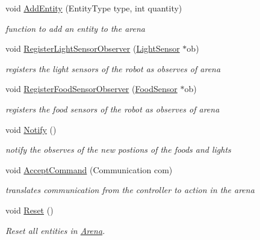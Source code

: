 \begin{DoxyCompactItemize}
void \mbox{\hyperlink{class_arena_a9e00ef1a079d49d648359952fcfaa9f3}{Add\+Entity}} (Entity\+Type type, int quantity)
\begin{DoxyCompactList}\small\item\em function to add an entity to the arena \end{DoxyCompactList}\item 
void \mbox{\hyperlink{class_arena_a3166b6d49cc1fa5a526317ee55eefa16}{Register\+Light\+Sensor\+Observer}} (\mbox{\hyperlink{class_light_sensor}{Light\+Sensor}} $\ast$ob)
\begin{DoxyCompactList}\small\item\em registers the light sensors of the robot as observes of arena \end{DoxyCompactList}\item 
void \mbox{\hyperlink{class_arena_acb467d8cd9635b2dd0a3a22f08f543c7}{Register\+Food\+Sensor\+Observer}} (\mbox{\hyperlink{class_food_sensor}{Food\+Sensor}} $\ast$ob)
\begin{DoxyCompactList}\small\item\em registers the food sensors of the robot as observes of arena \end{DoxyCompactList}\item 
\mbox{\label{class_arena_a694758081979e9944031000a375a3a6a}} 
void \mbox{\hyperlink{class_arena_a694758081979e9944031000a375a3a6a}{Notify}} ()
\begin{DoxyCompactList}\small\item\em notify the observes of the new postions of the foods and lights \end{DoxyCompactList}\item 
\mbox{\label{class_arena_a16fac8e4b2399fcf0db01a9722069c33}} 
void \mbox{\hyperlink{class_arena_a16fac8e4b2399fcf0db01a9722069c33}{Accept\+Command}} (Communication com)
\begin{DoxyCompactList}\small\item\em translates communication from the controller to action in the arena \end{DoxyCompactList}\item 
\mbox{\label{class_arena_a95e295d03a14385f4402a8e839fbae9b}} 
void \mbox{\hyperlink{class_arena_a95e295d03a14385f4402a8e839fbae9b}{Reset}} ()
\begin{DoxyCompactList}\small\item\em Reset all entities in \mbox{\hyperlink{class_arena}{Arena}}. \end{DoxyCompactList}\item 

\end{DoxyCompactItemize}
